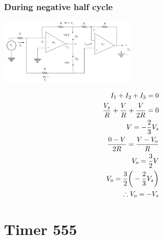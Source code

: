 \documentclass[a4paper, 12pt]{report}
\begin{document}
\begin{center}
\begin{center}
\begin{center}
\begin{center}
\begin{center}
\begin{center}
\begin{center}
\begin{center}
\begin{center}
\begin{center}
\begin{center}
\begin{center}
\begin{multicols}{2}
    \subsection*{During negative half cycle}
    \begin{center}
        \includegraphics[width=0.5\textwidth]{figures/212c1.png}\\
    \end{center}
    \begin{equation}\notag
        \begin{align}
            I_1 + I_2 + I_3 = 0\\
            \frac{V_s}{R} + \frac{V}{R} + \frac{V}{2R} = 0\\
            V = -\frac{2}{3}V_s\\
            \frac{0-V}{2R} = \frac{V-V_o}{R}\\
            V_o = \frac{3}{2}V\\
            V_o = \frac{3}{2}\bigg(-\frac{2}{3}V_s\bigg)\\
            \therefore V_o = -V_s
        \end{align}
    \end{equation}
\end{multicols}
\chapter{Timer 555}

\end{center}
\end{center}
\end{center}
\end{center}
\end{center}
\end{center}
\end{center}
\end{center}
\end{center}
\end{center}
\end{center}
\end{center}
\end{document}
